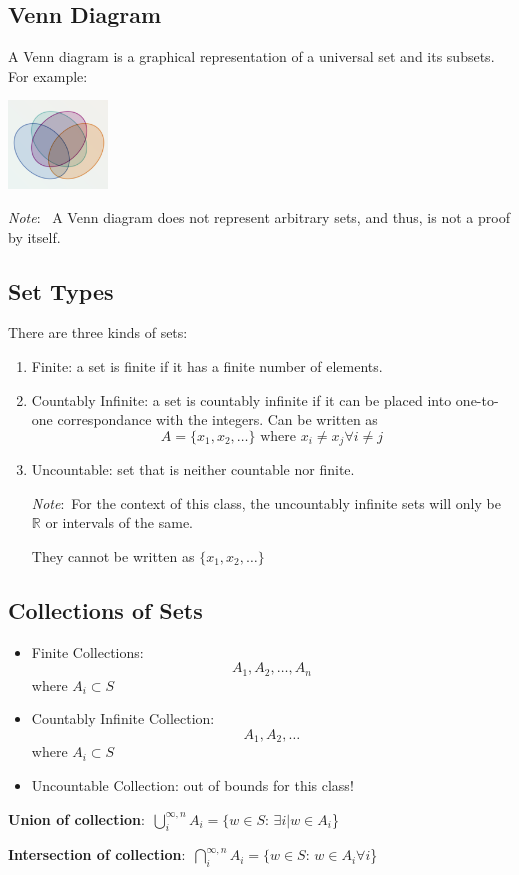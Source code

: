 \documentclass[nobib]{tufte-handout}
\newcommand{\defn}[2]{
        \begin{defbox}
        \noindent\textbf{#1}:\ #2
        \end{defbox}
}
\newcommand{\note}[1]{
        \begin{notebox}
        \noindent\textit{Note}:\ #1
        \end{notebox}
}
\begin{document}
\subsection{Venn Diagram}
A Venn diagram is a graphical representation of a universal set and its subsets.
For example:
\begin{center}
    \includegraphics*[width = 100px]{images/venn_example.png}
\end{center}

\note{ A Venn diagram does not represent arbitrary sets, and thus, is not a proof by itself.}

\subsection{Set Types}
There are three kinds of sets:
\begin{enumerate}
    \item Finite: a set is finite if it has a finite number of elements.
    \item Countably Infinite: a set is countably infinite if it can be placed into one-to-one correspondance with the integers. Can be written as \begin{equation*}
        A = \{x_1,x_2,\ldots\} \text{ where } x_i \neq x_j \forall i \neq j
    \end{equation*}
    \item Uncountable: set that is neither countable nor finite. 
    \note{For the context of this class, the uncountably infinite sets will only be $\mathbb{R}$ or intervals of the same.}
    They cannot be written as $\{x_1,x_2,\ldots\}$
\end{enumerate}
\subsection{Collections of Sets}
\begin{itemize}
    \item Finite Collections:
            \begin{equation*}
                A_1, A_2, \ldots, A_n
            \end{equation*}
            where $A_i \subset S$
    \item Countably Infinite Collection:
            \begin{equation*}
                A_1, A_2, \ldots
            \end{equation*}
            where $A_i \subset S$
    \item Uncountable Collection: out of bounds for this class!
\end{itemize}
\defn{Union of collection}{$\bigcup_i^{\infty,n} A_i = \{w \in S$: $\exists i | w \in A_i$\}}
\defn{Intersection of collection}{$\bigcap_i^{\infty,n} A_i = \{w \in S$: $w \in A_i \forall i$\}}
\end{document}
